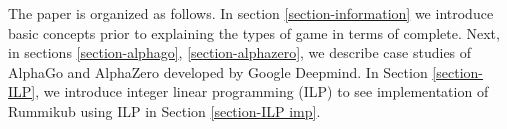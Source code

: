 \documentclass[11pt]{article}
\newtheorem{theorem}{Theorem}
\newcommand{\rr}{\mathbb{R}}
\DeclareMathOperator{\conv}{conv}
\DeclareMathOperator{\aff}{aff}
\begin{document}
%	
%	
	
	
	
	
	The paper is organized as follows. In section \ref{section-information} we introduce basic concepts prior to explaining the types of game in terms of complete. Next, in sections \ref{section-alphago}, \ref{section-alphazero}, we describe case studies of AlphaGo and AlphaZero developed by Google Deepmind. In Section \ref{section-ILP}, we introduce integer linear programming (ILP) to see implementation of Rummikub using ILP in Section \ref{section-ILP imp}.
	
\end{document}

